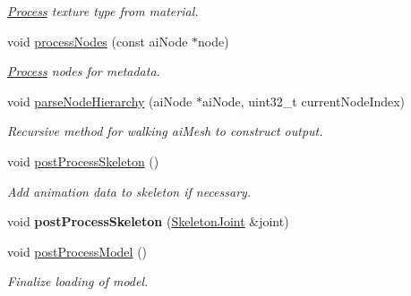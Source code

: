 \begin{Indent}
\begin{DoxyCompactItemize}
\begin{DoxyCompactList}\small\item\em \mbox{\hyperlink{classrev_1_1_process}{Process}} texture type from material. \end{DoxyCompactList}\item 
\mbox{\label{classrev_1_1_model_reader_a7f2bfbc3c0c449d9e8b981baf9840da0}} 
void \mbox{\hyperlink{classrev_1_1_model_reader_a7f2bfbc3c0c449d9e8b981baf9840da0}{process\+Nodes}} (const ai\+Node $\ast$node)
\begin{DoxyCompactList}\small\item\em \mbox{\hyperlink{classrev_1_1_process}{Process}} nodes for metadata. \end{DoxyCompactList}\item 
\mbox{\label{classrev_1_1_model_reader_ac7995f6db521ba8018873c463c37cb2a}} 
void \mbox{\hyperlink{classrev_1_1_model_reader_ac7995f6db521ba8018873c463c37cb2a}{parse\+Node\+Hierarchy}} (ai\+Node $\ast$ai\+Node, uint32\+\_\+t current\+Node\+Index)
\begin{DoxyCompactList}\small\item\em Recursive method for walking ai\+Mesh to construct output. \end{DoxyCompactList}\item 
\mbox{\label{classrev_1_1_model_reader_a25a618a8189508ed1711b84cb226f3c8}} 
void \mbox{\hyperlink{classrev_1_1_model_reader_a25a618a8189508ed1711b84cb226f3c8}{post\+Process\+Skeleton}} ()
\begin{DoxyCompactList}\small\item\em Add animation data to skeleton if necessary. \end{DoxyCompactList}\item 
\mbox{\label{classrev_1_1_model_reader_a3433790f3ec407bcd3e1c03e1b01be17}} 
void {\bfseries post\+Process\+Skeleton} (\mbox{\hyperlink{classrev_1_1_skeleton_joint}{Skeleton\+Joint}} \&joint)
\item 
\mbox{\label{classrev_1_1_model_reader_aafc1418bf49d7a86b11505e99271dc17}} 
void \mbox{\hyperlink{classrev_1_1_model_reader_aafc1418bf49d7a86b11505e99271dc17}{post\+Process\+Model}} ()
\begin{DoxyCompactList}\small\item\em Finalize loading of model. \end{DoxyCompactList}\item 

\end{DoxyCompactItemize}
\end{Indent}
